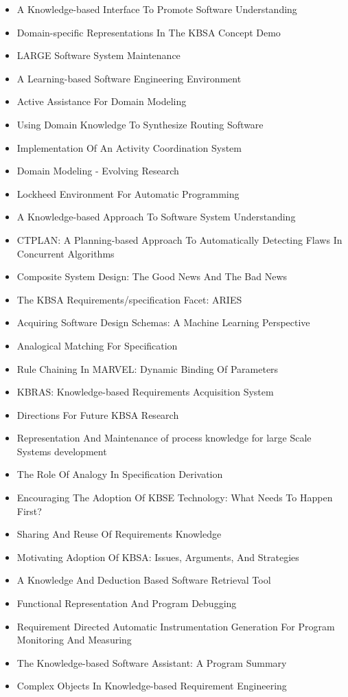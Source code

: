 {\small
\begin{itemize}[itemsep=-1ex]
  \item A Knowledge-based Interface To Promote Software Understanding
  \item Domain-specific Representations In The KBSA Concept Demo
  \item LARGE Software System Maintenance
  \item A Learning-based Software Engineering Environment
  \item Active Assistance For Domain Modeling
  \item Using Domain Knowledge To Synthesize Routing Software
  \item Implementation Of An Activity Coordination System
  \item Domain Modeling - Evolving Research
  \item Lockheed Environment For Automatic Programming
  \item A Knowledge-based Approach To Software System Understanding
  \item CTPLAN: A Planning-based Approach To Automatically Detecting Flaws In Concurrent Algorithms
  \item Composite System Design: The Good News And The Bad News
  \item The KBSA Requirements/specification Facet: ARIES
  \item Acquiring Software Design Schemas: A Machine Learning Perspective
  \item Analogical Matching For Specification
  \item Rule Chaining In MARVEL: Dynamic Binding Of Parameters
  \item KBRAS: Knowledge-based Requirements Acquisition System
  \item Directions For Future KBSA Research
  \item Representation And Maintenance of process knowledge for large Scale Systems development
  \item The Role Of Analogy In Specification Derivation
  \item Encouraging The Adoption Of KBSE Technology: What Needs To Happen First?
  \item Sharing And Reuse Of Requirements Knowledge
  \item Motivating Adoption Of KBSA: Issues, Arguments, And Strategies
  \item A Knowledge And Deduction Based Software Retrieval Tool
  \item Functional Representation And Program Debugging
  \item Requirement Directed Automatic Instrumentation Generation For Program Monitoring And Measuring
  \item The Knowledge-based Software Assistant: A Program Summary
  \item Complex Objects In Knowledge-based Requirement Engineering
\end{itemize}
}

